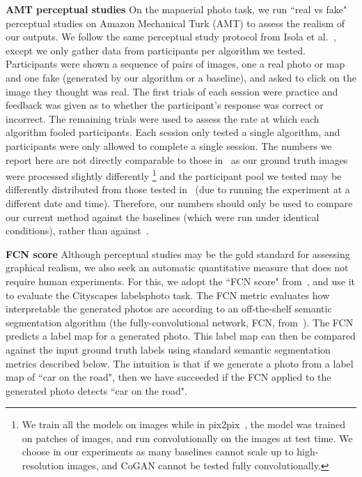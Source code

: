\documentclass[10pt,twocolumn,letterpaper]{article}
\newcommand{\shortcite}[1]{\cite{#1}}
\begin{document}
\hspace{4mm} {\bf AMT perceptual studies} On the mapaerial photo task, we run ``real vs fake" perceptual studies on Amazon Mechanical Turk (AMT) to assess the realism of our outputs. We follow the same perceptual study protocol from Isola et al.~\shortcite{isola2016image}, except we only gather data from  participants per algorithm we tested. Participants were shown a sequence of pairs of images, one a real photo or map and one fake (generated by our algorithm or a baseline), and asked to click on the image they thought was real. The first  trials of each session were practice and feedback was given as to whether the participant's response was correct or incorrect. The remaining  trials were used to assess the rate at which each algorithm fooled participants. Each session only tested a single algorithm, and participants were only allowed to complete a single session. The numbers we report here are not directly comparable to those in~\cite{isola2016image} as our ground truth images were processed slightly differently
\footnote{We train all the models on  images while in pix2pix~\cite{isola2016image}, the model was trained on  patches of  images, and run convolutionally on the  images at test time. We choose  in our experiments as many baselines cannot scale up to high-resolution images, and CoGAN cannot be tested fully convolutionally.} and the participant pool we tested may be differently distributed from those tested in~\cite{isola2016image} (due to running the experiment at a different date and time). Therefore, our numbers should only be used to compare our current method against the baselines (which were run under identical conditions), rather than against~\cite{isola2016image}. 

{\bf FCN score} Although perceptual studies may be the gold standard for assessing graphical realism, we also seek an automatic quantitative measure that does not require human experiments. For this, we adopt the ``FCN score" from~\cite{isola2016image}, and use it to evaluate the Cityscapes labelsphoto task. The FCN metric evaluates how interpretable the generated photos are according to an off-the-shelf semantic segmentation algorithm (the fully-convolutional network, FCN, from~\cite{long2015fully}). The FCN predicts a label map for a generated photo. This label map can then be compared against the input ground truth labels using standard semantic segmentation metrics described below. The intuition is that if we generate a photo from a label map of ``car on the road", then we have succeeded if the FCN applied to the generated photo detects ``car on the road".
\end{document}
